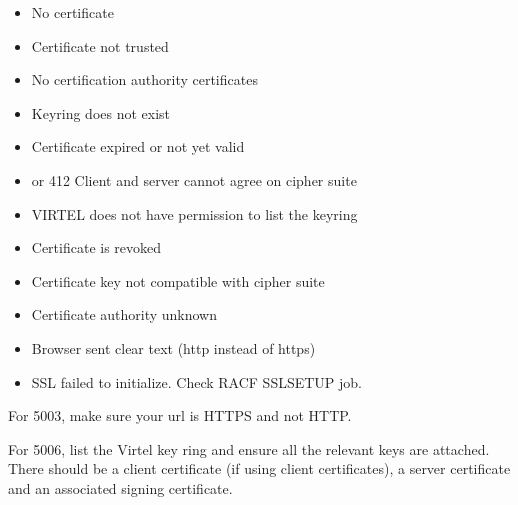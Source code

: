 \documentclass[letterpaper,10pt,english]{sphinxmanual}
\begin{document}
\begin{description}
\begin{itemize}
\item {} 
 No certificate

\item {} 
 Certificate not trusted

\item {} 
 No certification authority certificates

\item {} 
 Keyring does not exist

\item {} 
 Certificate expired or not yet valid

\item {} 
 or 412 Client and server cannot agree on cipher suite

\item {} 
 VIRTEL does not have permission to list the keyring

\item {} 
 Certificate is revoked

\item {} 
 Certificate key not compatible with cipher suite

\item {} 
 Certificate authority unknown

\item {} 
 Browser sent clear text (http instead of https)

\item {} 
 SSL failed to initialize. Check RACF SSLSETUP job.

\end{itemize}

\end{description}

\sphinxAtStartPar
For 5003, make sure your url is HTTPS and not HTTP.

\sphinxAtStartPar
For 5006, list the Virtel key ring and ensure all the relevant keys are attached. There should be a client certificate (if using client certificates), a server certificate and an associated signing certificate.
\end{document}
